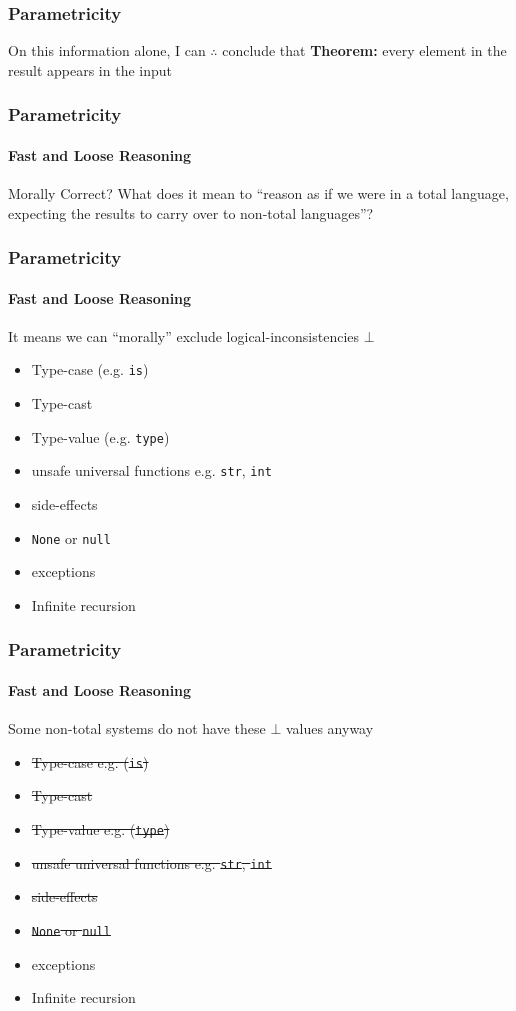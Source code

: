 \begin{frame}
\frametitle{Parametricity}
\begin{block}{On this information alone, I can $\therefore$ conclude that}
\textbf{Theorem:} every element in the result appears in the input
\end{block}
\end{frame}


\begin{frame}
\frametitle{Parametricity}
\framesubtitle{Fast and Loose Reasoning}
\begin{block}{Morally Correct?}
What does it mean to ``reason as if we were in a total language, expecting the results to carry over to non-total languages''?
\end{block}
\end{frame}


\begin{frame}
\frametitle{Parametricity}
\framesubtitle{Fast and Loose Reasoning}
\begin{block}{It means we can ``morally'' exclude logical-inconsistencies $\bot$}
\begin{itemize}
  \item Type-case (e.g. \lstinline{is})
  \item Type-cast
  \item Type-value (e.g. \lstinline{type})
  \item unsafe universal functions e.g. \lstinline{str}, \lstinline{int}
  \item side-effects
  \item \lstinline{None} or \lstinline{null}
  \item exceptions
  \item Infinite recursion
\end{itemize}
\end{block}
\end{frame}


\begin{frame}
\frametitle{Parametricity}
\framesubtitle{Fast and Loose Reasoning}
\begin{block}{Some non-total systems do not have these $\bot$ values anyway}
\begin{itemize}
  \item \sout{Type-case e.g. (\lstinline{is})}
  \item \sout{Type-cast}
  \item \sout{Type-value e.g. (\lstinline{type})}
  \item \sout{unsafe universal functions e.g. \lstinline{str}, \lstinline{int}}
  \item \sout{side-effects}
  \item \sout{\lstinline{None} or \lstinline{null}}
  \item exceptions
  \item Infinite recursion
\end{itemize}
\end{block}
\end{frame}


